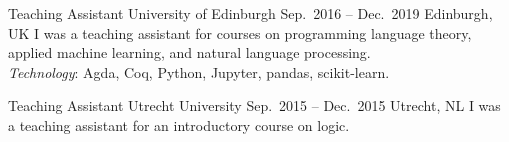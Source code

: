 \cvevent
{Teaching Assistant}
{University of Edinburgh}
{Sep.\ 2016 -- Dec.\ 2019}
{Edinburgh, UK}
I was a teaching assistant for courses on programming language theory,
applied machine learning, and natural language processing.\\
\emph{Technology}: Agda, Coq, Python, Jupyter, pandas, scikit-learn.

\divider

\cvevent
{Teaching Assistant}
{Utrecht University}
{Sep.\ 2015 -- Dec.\ 2015}
{Utrecht, NL}
I was a teaching assistant for an introductory course on logic.
